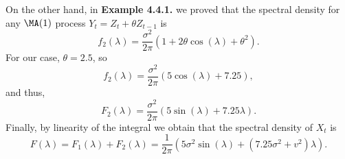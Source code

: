 On the other hand, in \textbf{Example 4.4.1.} we proved that the spectral density for any $\MA(1)$ process $Y_t = Z_t + \theta Z_{t-1}$ is 
\[ f_2(\lambda) = \frac{\sigma^2}{2\pi} (1+2\theta \cos(\lambda) + \theta^2). \]
For our case, $\theta = 2.5$, so 
\[ f_2(\lambda) = \frac{\sigma^2}{2\pi} (5 \cos(\lambda) + 7.25), \]
and thus,
\[ F_2(\lambda) = \frac{\sigma^2}{2\pi} (5 \sin(\lambda) + 7.25 \lambda). \]
Finally, by linearity of the integral we obtain that the spectral density of $X_t$ is
\[ F(\lambda) = F_1(\lambda) + F_2(\lambda) = \frac{1}{2\pi}(5\sigma^2 \sin(\lambda) + (7.25 \sigma^2 + v^2)\lambda). \]
